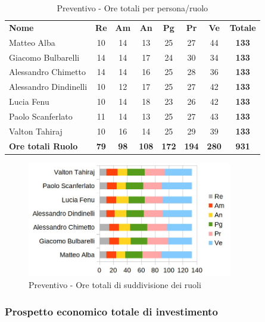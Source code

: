 		\begin{table} [h!]
			\begin{center}
				\begin{tabular} { m{3.5cm} c c c c c c c }
					\rowcolor{lightgray}
					\textbf{Nome} & \textbf{Re} & \textbf{Am} & \textbf{An} & \textbf{Pg} & \textbf{Pr} & \textbf{Ve} & \textbf{Totale} \\
					Matteo Alba & 10 & 14 & 13 & 25 & 27 & 44 & \textbf{133} \\
					Giacomo Bulbarelli & 14 & 14 & 17 & 24 & 30 & 34 & \textbf{133} \\
					Alessandro Chimetto & 14 & 14 & 16 & 25 & 28 & 36 & \textbf{133} \\
					Alessandro Dindinelli & 10 & 12 & 17 & 25 & 27 & 42 & \textbf{133} \\
					Lucia Fenu & 10 & 14 & 18 & 23 & 26 & 42 & \textbf{133} \\
					Paolo Scanferlato & 11 & 14 & 13 & 25 & 27 & 43 & \textbf{133} \\
					Valton Tahiraj & 10 & 16 & 14 & 25 & 29 & 39 & \textbf{133} \\
					\textbf{Ore totali Ruolo} & \textbf{79} & \textbf{98} & \textbf{108} & \textbf{172} & \textbf{194}& \textbf{280} & \textbf{931}
				\end{tabular}
				\caption{Preventivo - Ore totali per persona/ruolo}
			\end{center}
		\end{table}
	
		\begin{figure} [h!]
			\centering
			\includegraphics[width=0.8\textwidth]{res/img/grafici/ore_totali_di_investimento.jpg}
			\caption{Preventivo - Ore totali di suddivisione dei ruoli} 
		\end{figure}
	
	\newpage
	
	\subsubsection{Prospetto economico totale di investimento}
	
